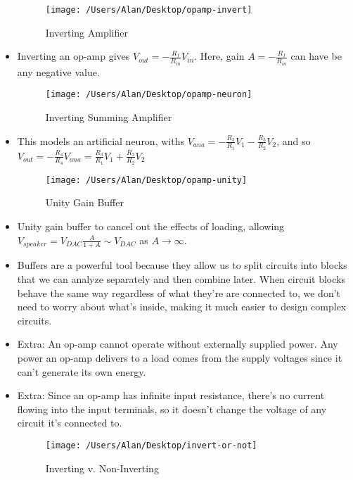 \documentclass{article}
\begin{document}
\begin{itemize}
\begin{figure} [h!]
	\begin{center}
	\texttt{[image: /Users/Alan/Desktop/opamp-invert]}
	\caption{Inverting Amplifier}
	\label{fig}
	\end{center}
\end{figure}
	\item Inverting an op-amp gives {\color{red} $V_{out} = -\frac{R_f}{R_{in}} V_{in}$}. Here, gain $A = -\frac{R_f}{R_{in}}$ can have be any negative value.

\begin{figure} [h!]
	\begin{center}
	\texttt{[image: /Users/Alan/Desktop/opamp-neuron]}
	\caption{Inverting Summing Amplifier}
	\label{fig}
	\end{center}
\end{figure}
	\item This models an artificial neuron, withs $V_{ana} = -\frac{R_3}{R_1}V_1 - \frac{R_3}{R_2}V_2$, and so {\color{red} $V_{out} = -\frac{R_4}{R_4}V_{ana} = \frac{R_3}{R_1}V_1 + \frac{R_3}{R_2}V_2$}

\begin{figure} [h!]
	\begin{center}
	\texttt{[image: /Users/Alan/Desktop/opamp-unity]}
	\caption{Unity Gain Buffer}
	\label{fig}
	\end{center}
\end{figure}
	\item {\color{blue} Unity gain buffer} to cancel out the effects of loading, allowing $V_{speaker} = V_{DAC}\frac{A}{1+A}\sim V_{DAC}$ as $A\rightarrow\infty$.
	\item Buffers are a powerful tool because they allow us to split circuits into blocks that we can analyze separately and then combine later. When circuit blocks behave the same way regardless of what they’re are connected to, we don’t need to worry about what’s inside, making it much easier to design complex circuits.

	\item Extra: An op-amp cannot operate without externally supplied power. Any power an op-amp delivers to a load comes from the supply voltages since it can't generate its own energy.
	\item Extra: Since an op-amp has infinite input resistance, there's no current flowing into the input terminals, so it doesn't change the voltage of any circuit it's connected to.

\begin{figure} [h!]
	\begin{center}
	\texttt{[image: /Users/Alan/Desktop/invert-or-not]}
	\caption{Inverting v. Non-Inverting}
	\label{fig}
	\end{center}
\end{figure}

\end{itemize}
\end{document}

